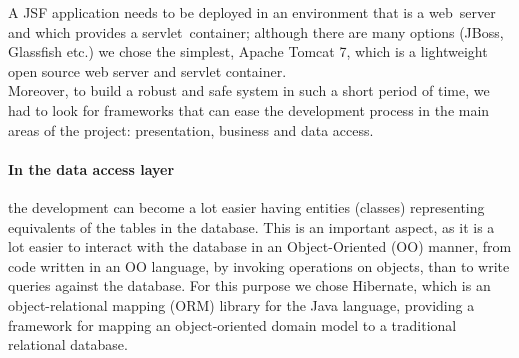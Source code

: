 \noindent A JSF application needs to be deployed in an environment that is a web~server and which provides a servlet~container; although there are many options (JBoss, Glassfish etc.) we chose the simplest, Apache Tomcat 7, which is a lightweight open source web server and servlet container.
\\

\noindent Moreover, to build a robust and safe system in such a short period of time, we had to look for frameworks that can ease the development process in the main areas of the project: presentation, business and data access.
\\

\paragraph{In the data access layer} the development can become a lot easier having entities (classes) representing equivalents of the tables in the database. This is an important aspect, as it is a lot easier to interact with the database in an Object-Oriented (OO) manner, from code written in an OO language, by invoking operations on objects, than to write queries against the database. For this purpose we chose Hibernate, which is an object-relational mapping (ORM) library for the Java language, providing a framework for mapping an object-oriented domain model to a traditional relational database.
\\

